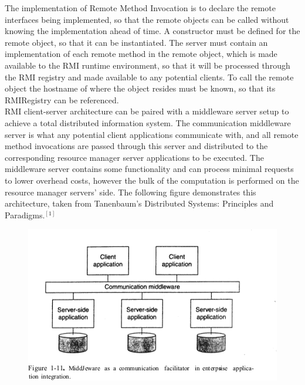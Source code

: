 \documentclass[letterpaper,12pt]{article}
\begin{document}
	The implementation of Remote Method Invocation is to declare the remote interfaces being implemented, so that the remote objects can be called without knowing the implementation ahead of time. A constructor must be defined for the remote object, so that it can be instantiated. The server must contain an implementation of each remote method in the remote object, which is made available to the RMI runtime environment, so that it will be processed through the RMI registry and made available to any potential clients. To call the remote object the hostname of where the object resides must be known, so that its RMIRegistry can be referenced. \\
	
	RMI client-server architecture can be paired with a  middleware server setup to achieve a total distributed information system. The communication middleware server is what any potential client applications communicate with, and all remote method invocations are passed through this server and distributed to the corresponding resource manager server applications to be executed. The middleware server contains some functionality and can process minimal requests to lower overhead costs, however the bulk of the computation is performed on the resource manager servers' side. The following figure demonstrates this architecture, taken from Tanenbaum's Distributed Systems: Principles and Paradigms$.^{[1]}$
	
	\pagebreak
	
	
	\begin{figure}[ht] 
		\centering \includegraphics[width=0.8\columnwidth]{figure1.png}
		
	\end{figure}
	
\end{document}
